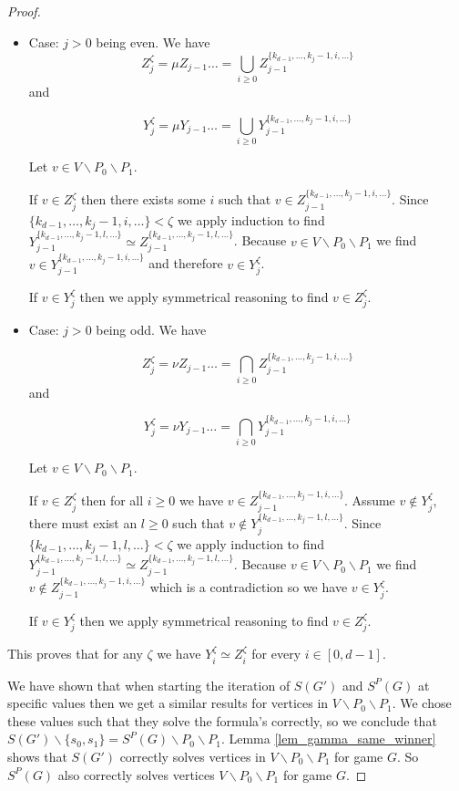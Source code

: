 \begin{theorem}
\begin{proof}
\begin{itemize}
			\item Case: $j > 0$ being even. We have 
			\[ Z_j^{\zeta} = \mu Z_{j-1}\dots = \bigcup_{i\geq 0} Z_{j-1}^{\{k_{d-1},\dots,k_j-1,i,\dots\}}\]
			and 
			
			\[ Y_j^{\zeta} = \mu Y_{j-1}\dots = \bigcup_{i\geq 0} Y_{j-1}^{\{k_{d-1},\dots,k_j-1,i,\dots\}}\]
			
			Let $v \in V \backslash P_0 \backslash P_1$.
			
			If $v \in Z_j^{\zeta}$ then there exists some $i$ such that $v \in Z_{j-1}^{\{k_{d-1},\dots,k_j-1,i,\dots\}}$. Since $\{k_{d-1},\dots,k_j-1,i,\dots\} < \zeta$ we apply induction to find $Y_{j-1}^{\{k_{d-1},\dots,k_j-1,l,\dots\}} \simeq Z_{j-1}^{\{k_{d-1},\dots,k_j-1,l,\dots\}}$. Because $v \in V \backslash P_0 \backslash P_1$ we find $v \in Y_{j-1}^{\{k_{d-1},\dots,k_j-1,i,\dots\}}$ and therefore $v \in Y_j^{\zeta}$.
			
			If $v \in Y_j^{\zeta}$ then we apply symmetrical reasoning to find $v \in Z_j^{\zeta}$.
			\item Case: $j > 0$ being odd. We have 
			
			\[ Z_j^{\zeta} = \nu Z_{j-1}\dots = \bigcap_{i\geq 0} Z_{j-1}^{\{k_{d-1},\dots,k_j-1,i,\dots\}}\]
			and 
			
			\[ Y_j^{\zeta} = \nu Y_{j-1}\dots = \bigcap_{i\geq 0} Y_{j-1}^{\{k_{d-1},\dots,k_j-1,i,\dots\}}\]
			
			Let $v \in V \backslash P_0 \backslash P_1$.
			
			If $v \in Z_j^{\zeta}$ then for all $i \geq 0$ we have $v \in Z_{j-1}^{\{k_{d-1},\dots,k_j-1,i,\dots\}}$. Assume $v \notin Y_j^{\zeta}$, there must exist an $l \geq 0$ such that $v \notin Y_j^{\{k_{d-1},\dots,k_j-1,l,\dots\}}$. Since $\{k_{d-1},\dots,k_j-1,l,\dots\} < \zeta$ we apply induction to find $Y_{j-1}^{\{k_{d-1},\dots,k_j-1,l,\dots\}} \simeq Z_{j-1}^{\{k_{d-1},\dots,k_j-1,l,\dots\}}$. Because $v \in V \backslash P_0 \backslash P_1$ we find $v \notin Z_{j-1}^{\{k_{d-1},\dots,k_j-1,i,\dots\}}$ which is a contradiction so we have $v \in Y_j^{\zeta}$.
			
			If $v \in Y_j^{\zeta}$ then we apply symmetrical reasoning to find $v \in Z_j^{\zeta}$.
		\end{itemize}
		
		This proves that for any $\zeta$ we have $Y_i^{\zeta} \simeq Z_i^{\zeta}$ for every $i \in [0,d-1]$.
		
		We have shown that when starting the iteration of $S(G')$ and $S^P(G)$ at specific values then we get a similar results for vertices in $V \backslash P_0 \backslash P_1$. We chose these values such that they solve the formula's correctly, so we conclude that $S(G') \backslash \{s_0,s_1\} = S^P(G) \backslash P_0 \backslash P_1$. Lemma \ref{lem_gamma_same_winner} shows that $S(G')$ correctly solves vertices in $V \backslash P_0 \backslash P_1$ for game $G$. So $S^P(G)$ also correctly solves vertices $V \backslash P_0 \backslash P_1$ for game $G$. 
		

\end{proof}
\end{theorem}
